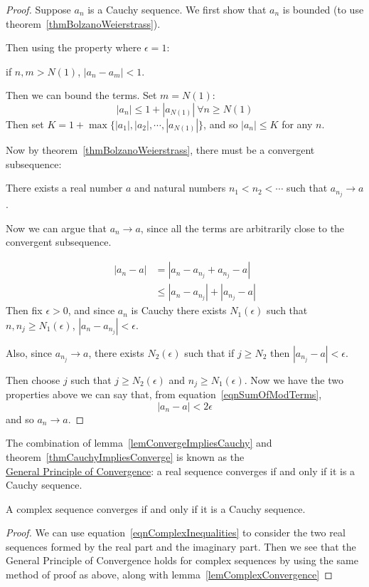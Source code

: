 \documentclass[../Main.tex]{subfiles}
\begin{document}
\begin{proof}
    Suppose $a_n$ is a Cauchy sequence. We first show that $a_n$ is bounded (to use theorem~\ref{thmBolzanoWeierstrass}).\par
    Then using the property where $\epsilon = 1$:\par
    if $n, m > N(1)$, $|a_n - a_m| < 1$.\par
    Then we can bound the terms. Set $m = N(1)$:
    \begin{equation*}
        |a_n| \leq 1 + |a_{N(1)}|~\forall n \geq N(1)
    \end{equation*}
    Then set $K = 1 + \max{\{|a_1|, |a_2|, \cdots, |a_{N(1)}|\}}$, and so $|a_n| \leq K$ for any $n$.\par
    Now by theorem~\ref{thmBolzanoWeierstrass}, there must be a convergent subsequence:\par
    There exists a real number $a$ and natural numbers $n_1 < n_2 < \cdots$ such that $a_{n_j} \to a$.\par
    Now we can argue that $a_n \to a$, since all the terms are arbitrarily close to the convergent subsequence.\par
    \begin{align}
        |a_n - a| &= |a_n - a_{n_j} + a_{n_j} - a| \nonumber \\
        &\leq |a_n - a_{n_j}| + |a_{n_j} - a| \label{eqnSumOfModTerms}
    \end{align}
    Then fix $\epsilon > 0$, and since $a_n$ is Cauchy there exists $N_1(\epsilon)$ such that $n, n_j \geq N_1(\epsilon)$, $|a_n - a_{n_j}| < \epsilon$.\par
    Also, since $a_{n_j} \to a$, there exists $N_2(\epsilon)$ such that if $j \geq N_2$ then $|a_{n_j} - a| < \epsilon$.\par
    Then choose $j$ such that $j \geq N_2(\epsilon)$ and $n_j \geq N_1(\epsilon)$. Now we have the two properties above we can say that, from equation~\ref{eqnSumOfModTerms},
    \begin{equation*}
        |a_n - a| < 2 \epsilon
    \end{equation*}
    and so $a_n \to a$.
\end{proof}
The combination of lemma~\ref{lemConvergeImpliesCauchy} and theorem~\ref{thmCauchyImpliesConverge} is known as the \\ \underline{General Principle of Convergence}: a real sequence converges if and only if it is a Cauchy sequence.
\begin{corollary}
    A complex sequence converges if and only if it is a Cauchy sequence.
    \label{corComplexCauchyConvergence}
\end{corollary}
\begin{proof}
    We can use equation~\ref{eqnComplexInequalities} to consider the two real sequences formed by the real part and the imaginary part. Then we see that the General Principle of Convergence holds for complex sequences by using the same method of proof as above, along with lemma~\ref{lemComplexConvergence}
\end{proof}
\end{document}
